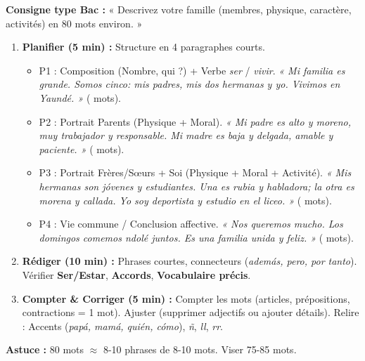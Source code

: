 \documentclass[11pt]{article}
\begin{document}
\begin{methode}
\textbf{Consigne type Bac :} « Descrivez votre famille (membres, physique, caractère, activités) en 80 mots environ. »
\begin{enumerate}
    \item \textbf{Planifier (5 min) :} Structure en 4 paragraphes courts.
        \begin{itemize}
            \item P1 : Composition (Nombre, qui ?) + Verbe \emph{ser} / \emph{vivir}. \emph{« Mi familia es grande. Somos cinco: mis padres, mis dos hermanas y yo. Vivimos en Yaundé. »} ( mots).
            \item P2 : Portrait Parents (Physique + Moral). \emph{« Mi padre es alto y moreno, muy trabajador y responsable. Mi madre es baja y delgada, amable y paciente. »} ( mots).
            \item P3 : Portrait Frères/Sœurs + Soi (Physique + Moral + Activité). \emph{« Mis hermanas son jóvenes y estudiantes. Una es rubia y habladora; la otra es morena y callada. Yo soy deportista y estudio en el liceo. »} ( mots).
            \item P4 : Vie commune / Conclusion affective. \emph{« Nos queremos mucho. Los domingos comemos ndolé juntos. Es una familia unida y feliz. »} ( mots).
        \end{itemize}
    \item \textbf{Rédiger (10 min) :} Phrases courtes, connecteurs (\emph{además, pero, por tanto}). Vérifier \textbf{Ser/Estar}, \textbf{Accords}, \textbf{Vocabulaire précis}.
    \item \textbf{Compter \& Corriger (5 min) :} Compter les mots (articles, prépositions, contractions = 1 mot). Ajuster (supprimer adjectifs ou ajouter détails). Relire : Accents (\emph{papá, mamá, quién, cómo}), \emph{ñ}, \emph{ll}, \emph{rr}.
\end{enumerate}
\textbf{Astuce :} 80 mots $\approx$ 8-10 phrases de 8-10 mots. Viser 75-85 mots.
\end{methode}
\end{document}
